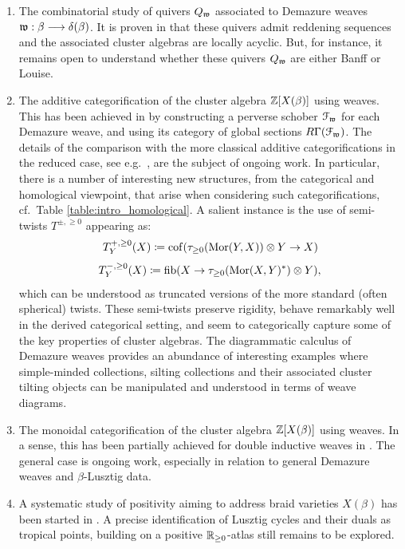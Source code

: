 \begin{enumerate}
    \item The combinatorial study of quivers $Q_{\mathfrak{w}}$ associated to Demazure weaves $\mathfrak{w}:\beta\longrightarrow\delta(\beta)$. It is proven in \cite{CGGLSS25} that these quivers admit reddening sequences and the associated cluster algebras are locally acyclic. But, for instance, it remains open to understand whether these quivers $Q_{\mathfrak{w}}$ are either Banff or Louise.\\

    \item The additive categorification of the cluster algebra $\mathbb{Z}[X(\beta)]$ using weaves. This has been achieved in \cite{CasalsChrist} by constructing a perverse schober $\mathcal{F}_{\mathfrak{w}}$ for each Demazure weave, and using its category of global sections $R\Gamma(\mathcal{F}_{\mathfrak{w}})$. The details of the comparison with the more classical additive categorifications in the reduced case, see e.g.~\cite{MR2242628}, are the subject of ongoing work. In particular, there is a number of interesting new structures, from the categorical and homological viewpoint, that arise when considering such categorifications, cf.~Table \ref{table:intro_homological}. A salient instance is the use of semi-twists $T^{\pm,\geq0}$ appearing as:
$$T^{+,\geq 0}_Y(X)\coloneqq \operatorname{cof}(\tau_{\geq 0}(\operatorname{Mor}(Y,X))\otimes Y\to X)$$
$$ T^{-,\geq0}_Y(X)\coloneqq \operatorname{fib}(X\to \tau_{\geq0}(\operatorname{Mor}(X,Y)^*)\otimes Y),$$
which can be understood as truncated versions of the more standard (often spherical) twists. These semi-twists preserve rigidity, behave remarkably well in the derived categorical setting, and seem to categorically capture some of the key properties of cluster algebras. The diagrammatic calculus of Demazure weaves provides an abundance of interesting examples where simple-minded collections, silting collections and their associated cluster tilting objects can be manipulated and understood in terms of weave diagrams.\\

    \item The monoidal categorification of the cluster algebra $\mathbb{Z}[X(\beta)]$ using weaves. In a sense, this has been partially achieved for double inductive weaves in \cite{KKOP2025MonoidalIII,Bi2026Quantization,HuhJungKimPark2026Comparison}. The general case is ongoing work, especially in relation to general Demazure weaves and $\beta$-Lusztig data.\\

    \item A systematic study of positivity aiming to address braid varieties $X(\beta)$ has been started in \cite{BaoHe2022TwistedPositivity}. A precise identification of Lusztig cycles and their duals as tropical points, building on a positive $\mathbb{R}_{\geq0}$-atlas still remains to be explored.\\
\end{enumerate}
